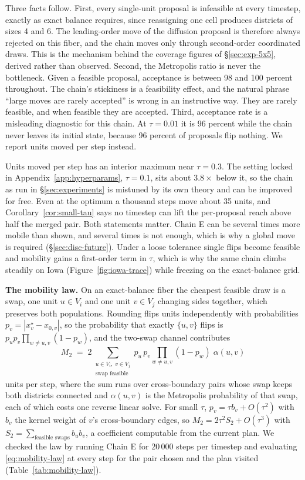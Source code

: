 \documentclass[11pt]{article}
\begin{document}
Three facts follow. First, every single-unit proposal is infeasible at
every timestep, exactly as exact balance requires, since reassigning
one cell produces districts of sizes 4 and 6. The leading-order move
of the diffusion proposal is therefore always rejected on this fiber,
and the chain moves only through second-order coordinated draws. This
is the mechanism behind the coverage figures of \S\ref{sec:exp-5x5},
derived rather than observed. Second, the Metropolis ratio is never
the bottleneck. Given a feasible proposal, acceptance is between 98
and 100 percent throughout. The chain's stickiness is a feasibility
effect, and the natural phrase ``large moves are rarely accepted'' is
wrong in an instructive way. They are rarely feasible, and when
feasible they are accepted. Third, acceptance rate is a misleading
diagnostic for this chain. At $\tau = 0.01$ it is 96 percent while
the chain never leaves its initial state, because 96 percent of
proposals flip nothing. We report units moved per step instead.

Units moved per step has an interior maximum near $\tau = 0.3$. The
setting locked in Appendix~\ref{app:hyperparams}, $\tau = 0.1$, sits
about $3.8\times$ below it, so the chain as run in
\S\ref{sec:experiments} is mistuned by its own theory and can be
improved for free. Even at the optimum a thousand steps move about 35
units, and Corollary~\ref{cor:small-tau} says no timestep can lift the
per-proposal reach above half the merged pair. Both statements
matter. Chain E can be several times more mobile than shown, and
several times is not enough, which is why a global move is required
(\S\ref{sec:disc-future}). Under a loose tolerance single flips become
feasible and mobility gains a first-order term in $\tau$, which is why
the same chain climbs steadily on Iowa (Figure~\ref{fig:iowa-trace})
while freezing on the exact-balance grid.

\textbf{The mobility law.} On an exact-balance fiber the cheapest
feasible draw is a swap, one unit $u \in V_i$ and one unit $v \in V_j$
changing sides together, which preserves both populations. Rounding
flips units independently with probabilities
$p_v = |x^\star_v - x_{0,v}|$, so the probability that exactly
$\{u,v\}$ flips is $p_u p_v \prod_{w \ne u,v}(1 - p_w)$, and the
two-swap channel contributes
\begin{equation}\label{eq:mobility-law}
  M_2 \;=\; 2 \sum_{\substack{u \in V_i,\; v \in V_j \\ \text{swap feasible}}}
  p_u\, p_v \prod_{w \ne u,v} (1 - p_w)\;\alpha(u,v)
\end{equation}
units per step, where the sum runs over cross-boundary pairs whose
swap keeps both districts connected and $\alpha(u,v)$ is the
Metropolis probability of that swap, each of which costs one reverse
linear solve. For small $\tau$, $p_v = \tau b_v + O(\tau^2)$ with
$b_v$ the kernel weight of $v$'s cross-boundary edges, so
$M_2 = 2\tau^2 S_2 + O(\tau^3)$ with
$S_2 = \sum_{\text{feasible swaps}} b_u b_v$, a coefficient computable
from the current plan. We checked the law by running Chain E for
$20\,000$ steps per timestep and evaluating \eqref{eq:mobility-law}
at every step for the pair chosen and the plan visited
(Table~\ref{tab:mobility-law}).
\end{document}

